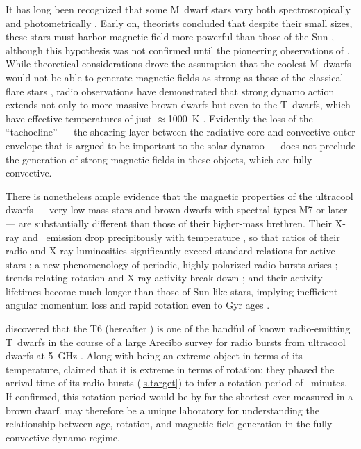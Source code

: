 \documentclass[twocolumn, times]{aastex6}
\begin{document}
It has long been recognized that some M~dwarf stars vary both
spectroscopically and photometrically \citep{l26, vm40}. Early on, theorists
concluded that despite their small sizes, these stars must harbor magnetic
field more powerful than those of the Sun , although this
hypothesis was not confirmed until the pioneering observations of
\citet{sl85}. While theoretical considerations drove the assumption that the
coolest M~dwarfs would not be able to generate magnetic fields as strong as
those of the classical flare stars , radio observations have
demonstrated that strong dynamo action extends not only to more massive brown
dwarfs \citep{bbb+01} but even to the T~dwarfs, which have effective
temperatures of just $\approx$1000~K \citep{rw12, rw16, khp+16}. Evidently the
loss of the ``tachocline'' --- the shearing layer between the radiative core
and convective outer envelope that is argued to be important to the solar
dynamo \citep[and references therein]{o03} --- does not preclude the
generation of strong magnetic fields in these objects, which are fully
convective.

There is nonetheless ample evidence that the magnetic properties of the
ultracool dwarfs --- very low mass stars and brown dwarfs with spectral types
M7 or later \citep{krl+99, mdb+99} --- are substantially different than those
of their higher-mass brethren. Their X-ray and \ha\ emission drop
precipitously with temperature \citep{gmr+00, whw+04, smf+06, bbf+10}, so that
ratios of their radio and X-ray luminosities significantly exceed standard
relations for active stars \citep{gb93, bbb+01, wcb14}; a new phenomenology of
periodic, highly polarized radio bursts arises \citep{brr+05, brpb+09, had+06,
  had+08}; trends relating rotation and X-ray activity break down
\citep{bbg+08, cwb14}; and their activity lifetimes become much longer than
those of Sun-like stars, implying inefficient angular momentum loss and rapid
rotation even to \apx Gyr ages \citep{grh02, whb+08, bmm+14}.

\citet{rw16} discovered that the T6  (hereafter )
is one of the handful of known radio-emitting T~dwarfs \citep{rw12, wbz13,
  khp+16} in the course of a large Arecibo survey for radio bursts from
ultracool dwarfs at 5~GHz \citep{rw13}. Along with being an extreme object in
terms of its temperature, \citet{rw16} claimed that it is extreme in terms of
rotation: they phased the arrival time of its radio bursts
(\autoref{s.target}) to infer a rotation period of ~minutes. If
confirmed, this rotation period would be by far the shortest ever measured in
a brown dwarf.  may therefore be a unique laboratory for
understanding the relationship between age, rotation, and magnetic field
generation in the fully-convective dynamo regime.
\end{document}
